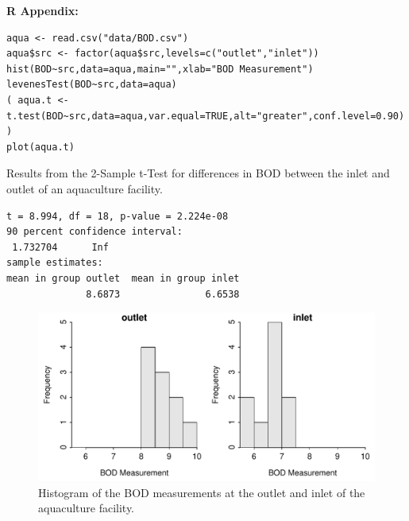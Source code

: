 \documentclass[10pt,openany]{book}\usepackage[]{graphicx}\usepackage[]{color}
\makeatletter
\newenvironment{kframe}{%
 \def\at@end@of@kframe{}%
 \ifinner\ifhmode%
  \def\at@end@of@kframe{\end{minipage}}%
  \begin{minipage}{\columnwidth}%
 \fi\fi%
 \def\FrameCommand##1{\hskip\@totalleftmargin \hskip-\fboxsep
 \colorbox{shadecolor}{##1}\hskip-\fboxsep
     \hskip-\linewidth \hskip-\@totalleftmargin \hskip\columnwidth}%
 \MakeFramed {\advance\hsize-\width
   \@totalleftmargin\z@ \linewidth\hsize
   \@setminipage}}%
 {\par\unskip\endMakeFramed%
 \at@end@of@kframe}
\newenvironment{knitrout}{}{} %
\makeatother
\begin{document}
\begin{minipage}{\textwidth}
\textbf{R Appendix:}
\begin{knitrout}
\color{fgcolor}\begin{kframe}
\begin{verbatim}
aqua <- read.csv("data/BOD.csv")
aqua$src <- factor(aqua$src,levels=c("outlet","inlet"))
hist(BOD~src,data=aqua,main="",xlab="BOD Measurement")
levenesTest(BOD~src,data=aqua)
( aqua.t <- t.test(BOD~src,data=aqua,var.equal=TRUE,alt="greater",conf.level=0.90) )
plot(aqua.t)
\end{verbatim}
\end{kframe}
\end{knitrout}
\end{minipage}

\begin{table}[h]
  \caption{Results from the 2-Sample t-Test for differences in BOD between the inlet and outlet of an aquaculture facility.}
  \label{tab:2tBOD}
\begin{knitrout}
\color{fgcolor}\begin{kframe}
\begin{verbatim}
t = 8.994, df = 18, p-value = 2.224e-08
90 percent confidence interval:
 1.732704      Inf 
sample estimates:
mean in group outlet  mean in group inlet 
              8.6873               6.6538 
\end{verbatim}
\end{kframe}
\end{knitrout}
\end{table}

\begin{knitrout}
\color{fgcolor}\begin{figure}[hbtp]

{\centering \includegraphics[width=.7\linewidth]{Figs/AquaHist-1} 

}

\caption[Histogram of the BOD measurements at the outlet and inlet of the aquaculture facility]{Histogram of the BOD measurements at the outlet and inlet of the aquaculture facility.}\label{fig:AquaHist}
\end{figure}


\end{knitrout}
\end{document}

